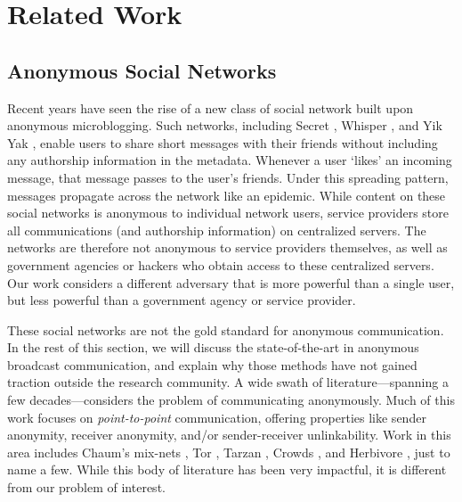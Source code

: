 \section{Related Work}

\subsection{Anonymous Social Networks} 
Recent years have seen the rise of a new class of social network built upon anonymous microblogging.
Such networks, including Secret \cite{secret}, Whisper \cite{whisper}, and Yik Yak \cite{yikyak}, enable users to share short messages with their friends without including any authorship information in the metadata. 
Whenever a user `likes' an incoming message, that message passes to the user's friends.
Under this spreading pattern, messages propagate across the network like an epidemic.
While content on these social networks is anonymous to individual network users, service providers store all communications (and authorship information) on centralized servers.
The networks are therefore not anonymous to service providers themselves, as well as government agencies or hackers who obtain access to these centralized servers.
Our work considers a different adversary that is more powerful than a single user, but less powerful than a government agency or service provider.

These social networks are not the gold standard for anonymous communication. In the rest of this section, we will discuss the state-of-the-art in anonymous broadcast communication, and explain why those methods have not gained traction outside the research community.
A wide swath of literature---spanning a few decades---considers the problem of communicating anonymously.
Much of this work focuses on \emph{point-to-point} communication, offering properties like sender anonymity, receiver anonymity, and/or sender-receiver unlinkability. 
Work in this area includes Chaum's mix-nets \cite{chaum1981untraceable}, Tor \cite{tor}, Tarzan \cite{tarzan}, Crowds \cite{reiter1998crowds}, and Herbivore \cite{goel2003herbivore}, just to name a few.
While this body of literature has been very impactful, it is different from our problem of interest.


